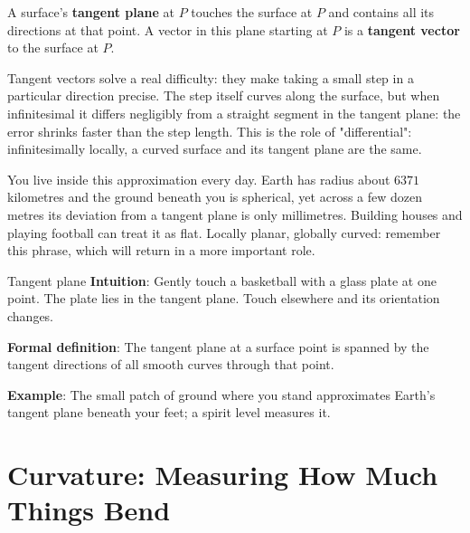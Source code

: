 \begin{center}
\end{center}

\begin{dingyi}
A surface's \textbf{tangent plane} at $P$ touches the surface at $P$ and contains all its directions at that point. A vector in this plane starting at $P$ is a \textbf{tangent vector} to the surface at $P$.
\end{dingyi}

Tangent vectors solve a real difficulty: they make taking a small step in a particular direction precise. The step itself curves along the surface, but when infinitesimal it differs negligibly from a straight segment in the tangent plane: the error shrinks faster than the step length. This is the role of "differential": infinitesimally locally, a curved surface and its tangent plane are the same.

You live inside this approximation every day. Earth has radius about $6371$ kilometres and the ground beneath you is spherical, yet across a few dozen metres its deviation from a tangent plane is only millimetres. Building houses and playing football can treat it as flat. Locally planar, globally curved: remember this phrase, which will return in a more important role.

\begin{shuyu}{Tangent plane}
\textbf{Intuition}: Gently touch a basketball with a glass plate at one point. The plate lies in the tangent plane. Touch elsewhere and its orientation changes.

\textbf{Formal definition}: The tangent plane at a surface point is spanned by the tangent directions of all smooth curves through that point.

\textbf{Example}: The small patch of ground where you stand approximates Earth's tangent plane beneath your feet; a spirit level measures it.
\end{shuyu}

\section{Curvature: Measuring How Much Things Bend}

